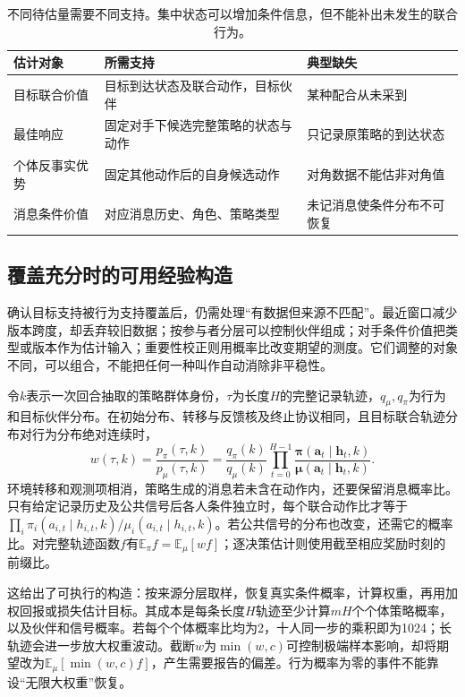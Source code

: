\begin{table}[htbp]
 \centering
 \begin{tabularx}{\linewidth}{@{}l >{\raggedright\arraybackslash}X >{\raggedright\arraybackslash}X@{}}
 \toprule
 估计对象 & 所需支持 & 典型缺失\\
 \midrule
 目标联合价值 & 目标到达状态及联合动作，目标伙伴 & 某种配合从未采到\\
 最佳响应 & 固定对手下候选完整策略的状态与动作 & 只记录原策略的到达状态\\
 个体反事实优势 & 固定其他动作后的自身候选动作 & 对角数据不能估非对角值\\
 消息条件价值 & 对应消息历史、角色、策略类型 & 未记消息使条件分布不可恢复\\
 \bottomrule
 \end{tabularx}
 \caption{不同待估量需要不同支持。集中状态可以增加条件信息，但不能补出未发生的联合行为。}
 \label{tab:rl-multi-agent-support}
\end{table}

\subsection{覆盖充分时的可用经验构造}
\label{sec:rl-multi-agent-reweight}

确认目标支持被行为支持覆盖后，仍需处理“有数据但来源不匹配”。最近窗口减少版本跨度，却丢弃较旧数据；按参与者分层可以控制伙伴组成；对手条件价值把类型或版本作为估计输入；重要性校正则用概率比改变期望的测度。它们调整的对象不同，可以组合，不能把任何一种叫作自动消除非平稳性。

令$k$表示一次回合抽取的策略群体身份，$\tau$为长度$H$的完整记录轨迹，$q_\mu,q_\pi$为行为和目标伙伴分布。在初始分布、转移与反馈核及终止协议相同，且目标联合轨迹分布对行为分布绝对连续时，
\begin{equation}
 w(\tau,k)=\frac{p_\pi(\tau,k)}{p_\mu(\tau,k)}
 =\frac{q_\pi(k)}{q_\mu(k)}
   \prod_{t=0}^{H-1}
   \frac{\bm\pi(\bm a_t\mid\bm h_t,k)}
        {\bm\mu(\bm a_t\mid\bm h_t,k)}.
 \label{eq:rl-multi-agent-is}
\end{equation}
环境转移和观测项相消，策略生成的消息若未含在动作内，还要保留消息概率比。只有给定记录历史及公共信号后各人条件独立时，每个联合动作比才等于$\prod_i\pi_i(a_{i,t}\mid h_{i,t},k)/\mu_i(a_{i,t}\mid h_{i,t},k)$。若公共信号的分布也改变，还需它的概率比。对完整轨迹函数$f$有$\mathbb E_\pi f=\mathbb E_\mu[wf]$；逐决策估计则使用截至相应奖励时刻的前缀比。

这给出了可执行的构造：按来源分层取样，恢复真实条件概率，计算权重，再用加权回报或损失估计目标。其成本是每条长度$H$轨迹至少计算$mH$个个体策略概率，以及伙伴和信号概率。若每个个体概率比均为2，十人同一步的乘积即为1024；长轨迹会进一步放大权重波动。截断$w$为$\min(w,c)$可控制极端样本影响，却将期望改为$\mathbb E_\mu[\min(w,c)f]$，产生需要报告的偏差。行为概率为零的事件不能靠设“无限大权重”恢复。

